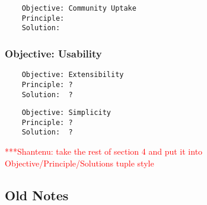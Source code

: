 \documentclass[a4paper,10pt]{article}
\newcommand{\jhanote}[1]{  {\textcolor{red}  { ***Shantenu: #1 }}}
\newcommand{\jhanote}[1]{}
\begin{document}
  \begin{verbatim}
    Objective: Community Uptake
    Principle: 
    Solution:  
   \end{verbatim}

\subsubsection{Objective: Usability}

  \begin{verbatim}
    Objective: Extensibility
    Principle: ?
    Solution:  ?
   \end{verbatim}

  \begin{verbatim}
    Objective: Simplicity
    Principle: ?
    Solution:  ?
 \end{verbatim}


 \jhanote{take the rest of section 4 and put it into
   Objective/Principle/Solutions tuple style}

 \subsection{Old Notes}
\end{document}
